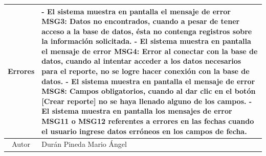 \documentclass[10pt,spanish]{article}
\providecommand{\tabularnewline}{\\}
\begin{document}
\begin{table}[!ht]
\begin{centering}
\begin{tabular}{|c||c|l|}
\hline 
		\multicolumn{2}{|c|}{Errores} & \multicolumn{1}{p{12cm}|}{

    - El sistema muestra en pantalla el mensaje de error MSG3: Datos no encontrados, cuando a pesar de tener acceso a la base de datos, ésta no contenga registros sobre la información solicitada.\newline    
	- El sistema muestra en pantalla el mensaje de error MSG4: Error al conectar con la base de datos, cuando al intentar acceder a los datos necesarios para el reporte, no se logre hacer conexión con la base de datos.\newline
	- El sistema muestra en pantalla el mensaje de error MSG8: Campos obligatorios, cuando al dar clic en el botón [Crear reporte] no se haya llenado alguno de los campos.\newline
	- El sistema muestra en pantalla los mensajes de error MSG11 o MSG12 referentes a errores en las fechas cuando el usuario ingrese datos erróneos en los campos de fecha.
}\tabularnewline						
		
		\hline 		
		\multicolumn{2}{|c|}{Autor} & Durán Pineda Mario Ángel\tabularnewline
		
		\hline 				
		\end{tabular}
		\par\end{centering}
		
	
	\label{tab:CasosdeUso:nombredecasodeuso} 
	\end{table}
\end{document}
